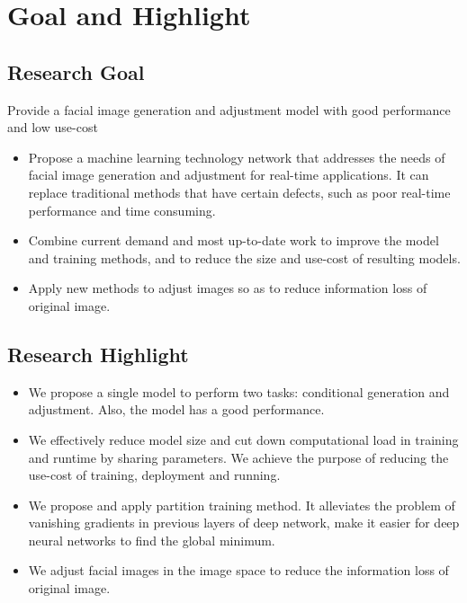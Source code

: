 \section{Goal and Highlight}

\subsection{Research Goal}
Provide a
facial image generation and adjustment model
with good performance
and low use-cost

\begin{itemize}
\item
Propose a machine learning technology network that addresses the needs of facial image generation and adjustment for real-time applications.
It can replace traditional methods that have certain defects, such as poor real-time performance and time consuming.
\item
Combine current demand and most up-to-date work to improve the model and training methods,
    and to reduce the size and use-cost of resulting models.
\item
Apply new methods to adjust images so as to reduce information loss of original image.
\end{itemize}
\subsection{Research Highlight}
\begin{itemize}
\item
We propose a single model to perform two tasks: conditional generation and adjustment. Also, the model has a good performance.
\item
We effectively reduce model size and cut down computational load in training and runtime by sharing parameters.
We achieve the purpose of reducing the use-cost of training, deployment and running.
\item
We propose and apply partition training method.
It alleviates the problem of vanishing gradients in previous layers of deep network,
    make it easier for deep neural networks to find the global minimum.

\item
We adjust facial images in the image space to reduce the information loss of original image.
\end{itemize}